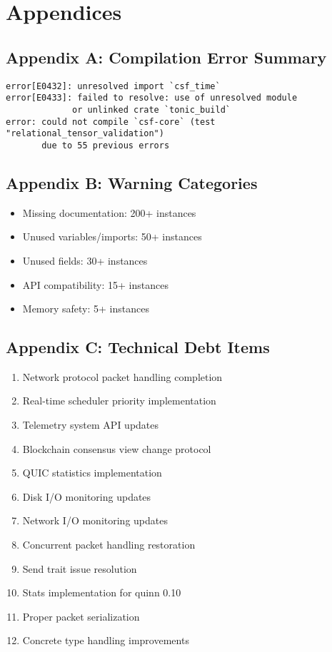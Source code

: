 \documentclass[11pt,a4paper]{article}
\begin{document}
\section{Appendices}

\subsection{Appendix A: Compilation Error Summary}

\begin{lstlisting}[language=text, frame=single, caption=Sample Compilation Errors]
error[E0432]: unresolved import `csf_time`
error[E0433]: failed to resolve: use of unresolved module 
             or unlinked crate `tonic_build`
error: could not compile `csf-core` (test "relational_tensor_validation") 
       due to 55 previous errors
\end{lstlisting}

\subsection{Appendix B: Warning Categories}

\begin{itemize}
    \item Missing documentation: 200+ instances
    \item Unused variables/imports: 50+ instances  
    \item Unused fields: 30+ instances
    \item API compatibility: 15+ instances
    \item Memory safety: 5+ instances
\end{itemize}

\subsection{Appendix C: Technical Debt Items}

\begin{enumerate}
    \item Network protocol packet handling completion
    \item Real-time scheduler priority implementation
    \item Telemetry system API updates
    \item Blockchain consensus view change protocol
    \item QUIC statistics implementation
    \item Disk I/O monitoring updates
    \item Network I/O monitoring updates
    \item Concurrent packet handling restoration
    \item Send trait issue resolution
    \item Stats implementation for quinn 0.10
    \item Proper packet serialization
    \item Concrete type handling improvements
\end{enumerate}
\end{document}
